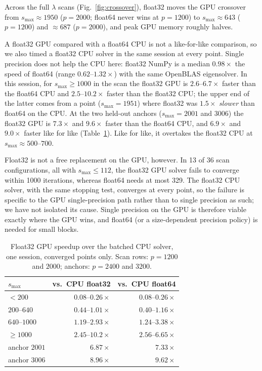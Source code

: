 \documentclass[conference]{IEEEtran}
\begin{document}
Across the full $\lambda$ scans (Fig.~\ref{fig:crossover}), float32 moves
the GPU crossover from $s_{\max}\approx1950$ ($p=2000$; float64 never wins at
$p=1200$) to $s_{\max}\approx643$ ($p=1200$) and $\approx687$ ($p=2000$), and
peak GPU memory roughly halves.

A float32 GPU compared with a float64 CPU is not a like-for-like comparison,
so we also timed a float32 CPU solver in the same session at every point.
Single precision does not help the CPU here: float32 NumPy is a median
$0.98\times$ the speed of float64 (range $0.62$--$1.32\times$) with the same
OpenBLAS eigensolver. In this session, for $s_{\max}\ge1000$ in the scan
the float32 GPU is $2.6$--$6.7\times$ faster than the float64 CPU and
$2.5$--$10.2\times$ faster than the float32 CPU; the upper end of the latter
comes from a point ($s_{\max}=1951$) where float32 was $1.5\times$
\emph{slower} than float64 on the CPU. At the two held-out anchors
($s_{\max}=2001$ and $3006$) the float32 GPU is $7.3\times$ and $9.6\times$
faster than the float64 CPU, and $6.9\times$ and $9.0\times$ faster like for
like (Table~\ref{tab:fp32}). Like for like, it overtakes the float32 CPU at
$s_{\max}\approx500$--$700$.

Float32 is not a free replacement on the GPU, however. In 13 of 36 scan
configurations, all with $s_{\max}\le112$, the float32 GPU solver fails to
converge within 1000 iterations, whereas float64 needs at most 329. The
float32 CPU solver, with the same stopping test, converges at every point,
so the failure is specific to the GPU single-precision path rather than to
single precision as such; we have not isolated its cause. Single precision on
the GPU is therefore viable exactly where the GPU wins, and float64 (or a
size-dependent precision policy) is needed for small blocks.

\begin{table}[t]
\centering
\caption{Float32 GPU speedup over the batched CPU solver, one session,
converged points only. Scan rows: $p=1200$ and $2000$; anchors: $p=2400$
and $3200$.}
\label{tab:fp32}
\begin{tabular}{lrr}
\toprule
$s_{\max}$ & vs.\ CPU float32 & vs.\ CPU float64 \\
\midrule
$<200$ & $0.08$--$0.26\times$ & $0.08$--$0.26\times$ \\
$200$--$640$ & $0.44$--$1.01\times$ & $0.40$--$1.16\times$ \\
$640$--$1000$ & $1.19$--$2.93\times$ & $1.24$--$3.38\times$ \\
$\ge1000$ & $\mathbf{2.45}$--$\mathbf{10.2\times}$ & $2.56$--$6.65\times$ \\
\midrule
anchor $2001$ & $6.87\times$ & $7.33\times$ \\
anchor $3006$ & $8.96\times$ & $9.62\times$ \\
\bottomrule
\end{tabular}
\end{table}
\end{document}
